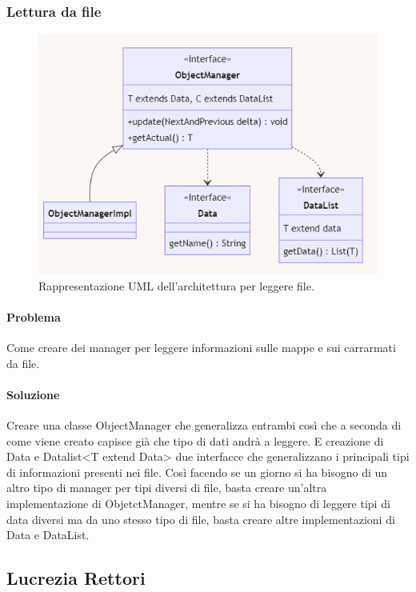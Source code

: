 \documentclass[a4paper,12pt]{report}
\begin{document}
\subsubsection*{Lettura da file}
%
\begin{figure}[H]
	\centering{}
	\includegraphics[scale=0.85]{img/objectManager.png}
	\caption{Rappresentazione UML dell'architettura per leggere file.}
	\label{img:strategy}
	\end{figure}
%	
\paragraph*{Problema} Come creare dei manager per leggere informazioni sulle mappe e sui carrarmati da file.
%
\paragraph*{Soluzione} Creare una classe ObjectManager che generalizza entrambi così che a seconda di come viene creato capisce già che tipo di dati andrà a leggere. E creazione di Data e Datalist<T extend Data> due interfacce che generalizzano i principali tipi di informazioni presenti nei file. Così facendo se un giorno si ha bisogno di un altro tipo di manager per tipi diversi di file, basta creare un’altra implementazione di ObjetctManager, mentre se si ha bisogno di leggere tipi di data diversi ma da uno stesso tipo di file, basta creare altre implementazioni di Data e DataList.
%
\newpage
\subsection*{Lucrezia Rettori}
%
\end{document}
